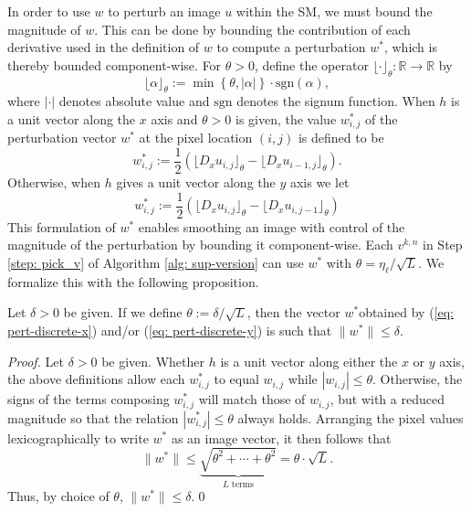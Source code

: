 \documentclass[smallextended]{svjour3}      %
\begin{document}
In order to use $w$ to perturb an image $u$ within the SM, we must bound the magnitude of $w$. This can be done by bounding the contribution of each derivative used in the definition of $w$ to compute a perturbation $w^{*}$, which is thereby bounded component-wise. For $\theta>0$, define the operator $\lfloor\cdot\rfloor_{\theta}:\mathbb{R}\rightarrow\mathbb{R}$ by
\begin{equation}
\lfloor\alpha\rfloor_{\theta}:=\min\left\{ \theta,|\alpha|\right\} \cdot\mbox{sgn}(\alpha),
\end{equation}
where $|\cdot|$ denotes absolute value and $\mbox{sgn}$ denotes the signum function. When $h$ is a unit vector along the $x$ axis and $\theta>0$ is given, the value $w_{i,j}^{*}$ of the perturbation vector $w^{*}$ at the pixel location $(i,j)$ is defined to be
\begin{equation}
w_{i,j}^{*}:=\frac{1}{2}\left(\lfloor D_{x}u_{i,j}\rfloor_{\theta}-\lfloor D_{x}u_{i-1,j}\rfloor_{\theta}\right).\label{eq: pert-discrete-x}
\end{equation}
Otherwise, when $h$ gives a unit vector along the $y$ axis we let
\begin{equation}
w_{i,j}^{*}:=\frac{1}{2}\left(\lfloor D_{x}u_{i,j}\rfloor_{\theta}-\lfloor D_{x}u_{i,j-1}\rfloor_{\theta}\right)\label{eq: pert-discrete-y}
\end{equation}
This formulation of $w^{*}$ enables smoothing an image with control of the magnitude of the perturbation by bounding it component-wise. Each $v^{k,n}$ in Step \ref{step: pick_v} of Algorithm \ref{alg: sup-version} can use $w^{*}$ with $\theta=\eta_{\ell}/\sqrt{L}$. We formalize this with the following proposition.
\begin{proposition}
	Let $\delta>0$ be given. If we define $\theta:=\delta/\sqrt{L}$, then the vector $w^{*}$obtained by (\ref{eq: pert-discrete-x}) and/or (\ref{eq: pert-discrete-y}) is such that $\|w^{*}\|\leq\delta$.
\end{proposition}
\begin{proof}
	Let $\delta>0$ be given. Whether $h$ is a unit vector along either the $x$ or $y$ axis, the above definitions allow each $w_{i,j}^{*}$ to equal $w_{i,j}$ while $|w_{i,j}|\leq\theta$. Otherwise, the signs of the terms composing $w_{i,j}^{*}$ will match those of $w_{i,j}$, but with a reduced magnitude so that the relation $|w_{i,j}^{*}|\leq\theta$ always holds. Arranging the pixel values lexicographically to write $w^{*}$ as an image vector, it then follows that
	\begin{equation}
	\|w^{*}\|\leq\underbrace{\sqrt{\theta^{2}+\cdots+\theta^{2}}}_{L\mbox{ terms}}=\theta\cdot\sqrt{L}.
	\end{equation}
	Thus, by choice of $\theta$, $\|w^{*}\|\leq\delta$.\qed
\end{proof}
\end{document}
